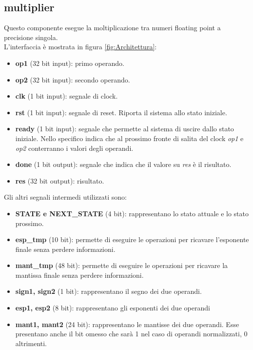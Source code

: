 \documentclass[]{IEEEtran}
\begin{document}
\subsection{multiplier}
Questo componente esegue la moltiplicazione tra numeri floating point a precisione singola.
\\L'interfaccia è mostrata in figura \ref{fig:Architettura}:
\begin{itemize}
    \item \textbf{op1} (32 bit input): primo operando.
    \item \textbf{op2} (32 bit input): secondo operando.
    \item \textbf{clk} (1 bit input): segnale di clock.
    \item \textbf{rst} (1 bit input): segnale di reset. Riporta il sistema allo stato iniziale.
    \item \textbf{ready} (1 bit input): segnale che permette al sistema di uscire dallo stato iniziale. Nello specifico indica che al prossimo fronte di salita del clock \textit{op1} e \textit{op2} conterranno i valori degli operandi.
    \item \textbf{done} (1 bit output): segnale che indica che il valore su \textit{res} è il risultato.
    \item \textbf{res} (32 bit output): risultato.
\end{itemize}

Gli altri segnali intermedi utilizzati sono:
\begin{itemize}\item \textbf{STATE e NEXT\_STATE} (4 bit): rappresentano lo stato attuale e lo stato prossimo.
    \item \textbf{esp\_tmp} (10 bit): permette di eseguire le operazioni per ricavare l'esponente finale senza perdere informazioni.
    \item \textbf{mant\_tmp} (48 bit): permette di eseguire le operazioni per ricavare la mantissa finale senza perdere informazioni.
    \item \textbf{sign1, sign2} (1 bit): rappresentano il segno dei due operandi.
    \item \textbf{esp1, esp2} (8 bit): rappresentano gli esponenti dei due operandi
    \item \textbf{mant1, mant2} (24 bit): rappresentano le mantisse dei due operandi. Esse presentano anche il bit omesso che sarà 1 nel caso di operandi normalizzati, 0 altrimenti.
\end{itemize}
\end{document}

